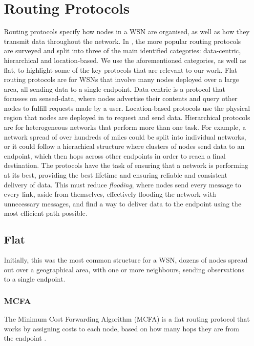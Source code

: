 \section{Routing Protocols} \label{bg:rp} 
	Routing protocols specify how nodes in a WSN are organised, as well as how they transmit data throughout the network. In \cite{Akkaya2005}, the more popular routing protocols are surveyed and split into three of the main identified categories: data-centric, hierarchical and location-based. We use the aforementioned categories, as well as flat, to highlight some of the key protocols that are relevant to our work. Flat routing protocols are for WSNs that involve many nodes deployed over a large area, all sending data to a single endpoint. Data-centric is a protocol that focusses on sensed-data, where nodes advertise their contents and query other nodes to fulfill requests made by a user. Location-based protocols use the physical region that nodes are deployed in to request and send data. Hierarchical protocols are for heterogeneous networks that perform more than one task. For example, a network spread of over hundreds of miles could be split into individual networks, or it could follow a hierachical structure where clusters of nodes send data to an endpoint, which then hops across other endpoints in order to reach a final destination.
	The protocols have the task of ensuring that a network is performing at its best, providing the best lifetime and ensuring reliable and consistent delivery of data. This must reduce \textit{flooding}, where nodes send every message to every link, aside from themselves, effectively flooding the network with unnecessary messages, and find a way to deliver data to the endpoint using the most efficient path possible.

\subsection{Flat}
	Initially, this was the most common structure for a WSN, dozens of nodes spread out over a geographical area, with one or more neighbours, sending observations to a single endpoint.

\subsubsection{MCFA} \label{bg:rp:mcfa}
	The Minimum Cost Forwarding Algorithm (MCFA) is a flat routing protocol that works by assigning costs to each node, based on how many hops they are from the endpoint \cite{Ye2001}. 

